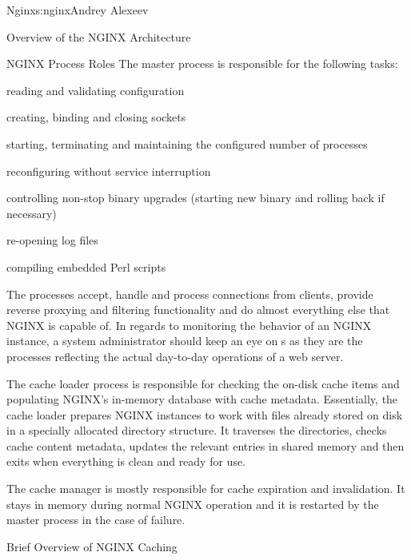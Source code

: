 \begin{aosachapter}{Nginx}{s:nginx}{Andrey Alexeev}
\begin{aosasect1}{Overview of the NGINX Architecture}
\begin{aosasect2}{NGINX Process Roles}
The master process is responsible for the following tasks:

\begin{aosaitemize}

\item reading and validating configuration

\item creating, binding and closing sockets

\item starting, terminating and maintaining the configured number of
   processes

\item reconfiguring without service interruption

\item controlling non-stop binary upgrades (starting new binary and
rolling back if necessary)

\item re-opening log files

\item compiling embedded Perl scripts

\end{aosaitemize}

The  processes accept, handle and process connections
from clients, provide reverse proxying and filtering functionality and
do almost everything else that NGINX is capable of. In regards to
monitoring the behavior of an NGINX instance, a system administrator
should keep an eye on s as they are the processes
reflecting the actual day-to-day operations of a web server.

The cache loader process is responsible for checking the on-disk cache
items and populating NGINX's in-memory database with cache
metadata. Essentially, the cache loader prepares NGINX instances to
work with files already stored on disk in a specially allocated
directory structure. It traverses the directories, checks cache
content metadata, updates the relevant entries in shared memory and
then exits when everything is clean and ready for use.

The cache manager is mostly responsible for cache expiration and
invalidation. It stays in memory during normal NGINX operation and it
is restarted by the master process in the case of failure.

\end{aosasect2}

\begin{aosasect2}{Brief Overview of NGINX Caching}


\end{aosasect2}
\end{aosasect1}
\end{aosachapter}
